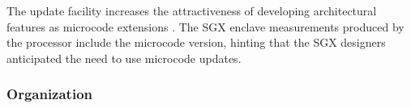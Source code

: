 The update facility increases the attractiveness of developing architectural
features as microcode extensions \cite{intel2008genetic, intel2012clusters}.
The SGX enclave measurements produced by the processor include the microcode
version, hinting that the SGX designers anticipated the need to use microcode
updates.

\subsubsection{Organization}












